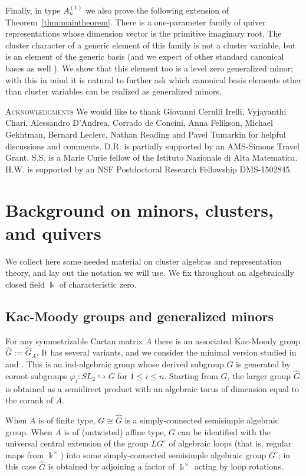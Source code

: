 \documentclass[12pt]{amsart}
\newcommand{\kk}{\Bbbk}
\newcommand\into{\hookrightarrow}
\theoremstyle{remark}
\numberwithin{equation}{section}
\numberwithin{figure}{section}
\begin{document}
Finally, in type $A_{n}^{\!(1)}$ we also prove the following extension of Theorem~\ref{thm:maintheorem}.
There is a one-parameter family of quiver representations whose dimension vector is the primitive imaginary root.
The cluster character of a generic element of this family is not a cluster variable, but is an element of the generic basis \cite{Dup12} (and we expect of other standard canonical bases as well \cite{BZ14,GHKK14}).
We show that this element too is a level zero generalized minor; with this in mind it is natural to further ask which canonical basis elements other than cluster variables can be realized as generalized minors.

\textsc{Acknowledgments}
We would like to thank Giovanni Cerulli Irelli, Vyjayanthi Chari, Alessandro D'Andrea, Corrado de Concini, Anna Felikson, Michael Gekhtman, Bernard Leclerc, Nathan Reading and Pavel Tumarkin for helpful discussions and comments.
D.R. is partially supported by an AMS-Simons Travel Grant.
S.S. is a Marie Curie fellow of the Istituto Nazionale di Alta Matematica.
H.W. is supported by an NSF Postdoctoral Research Fellowship DMS-1502845.

\section{Background on minors, clusters, and quivers}

We collect here some needed material on cluster algebras and representation theory, and lay out the notation we will use.
We fix throughout an algebraically closed field $\kk$ of characteristic zero.

\subsection{Kac-Moody groups and generalized minors}
\label{sec:group background}

For any symmetrizable Cartan matrix $A$ there is an associated Kac-Moody group $\widehat{G}:=\widehat{G}_A$.
It has several variants, and we consider the minimal version studied in \cite{KP83} and \cite[Section 7.4]{Kum02}.
This is an ind-algebraic group whose derived subgroup $G$ is generated by coroot subgroups $\varphi_i: SL_2 \into G$ for $1 \leq i \leq n$.
Starting from $G$, the larger group $\widehat{G}$ is obtained as a semidirect product with an algebraic torus of dimension equal to the corank of $A$.

When $A$ is of finite type, $G \cong \widehat{G}$ is a simply-connected semisimple algebraic group.
When $A$ is of (untwisted) affine type, $G$ can be identified with the universal central extension of the group $LG^\circ$ of algebraic loops (that is, regular maps from $\kk^\times$) into some simply-connected semisimple algebraic group $G^\circ$; in this case $\widehat{G}$ is obtained by adjoining a factor of $\kk^\times$ acting by loop rotations.
\end{document}
